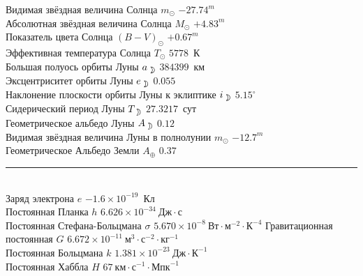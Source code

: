 Видимая звёздная величина Солнца $m_\odot$ \hfill $-27.74^m$\\
Абсолютная звёздная величина Солнца $M_\odot$ \hfill $+4.83^m$\\
Показатель цвета Солнца $(B - V)_\odot$ \hfill $+0.67^m$\\
Эффективная температура Солнца $T_\odot$ \hfill $5778$~К\\
Большая полуось орбиты Луны $a_{\moon}$ \hfill $384399$~км\\
Эксцентриситет орбиты Луны $e_{\moon}$ \hfill $0.055$\\
Наклонение плоскости орбиты Луны к эклиптике $i_{\moon}$ \hfill $5.15^\circ$\\
Сидерический период Луны $T_{\moon}$ \hfill $27.3217$~сут\\
Геометрическое альбедо Луны $A_{\moon}$ \hfill $0.12$\\
Видимая звёздная величина Луны в полнолунии $m_{\odot}$ \hfill $-12.7^m$\\
Геометрическое Альбедо Земли $A_\oplus$ \hfill $0.37$\\[-5pt]
\rule{\tw}{.7pt}\\
Заряд электрона $e$ \hfill $-1.6 \times 10^{-19}$~Кл\\
Постоянная Планка $h$ \hfill $6.626 \times 10^{-34}~\text{Дж}\cdot\text{с}$\\
Постоянная Стефана-Больцмана $\sigma$ \hfill $5.670 \times 10^{-8}~\text{Вт} \cdot \text{м}^{-2} \cdot \text{К}^{-4}$
Гравитационная постоянная $G$ \hfill $6.672 \times 10^{-11}~\text{м}^3 \cdot \text{с}^{-2} \cdot \text{кг}^{-1}$\\
Постоянная Больцмана $k$ \hfill $1.381 \times 10^{-23}~\text{Дж} \cdot \text{К}^{-1}$\\
Постоянная Хаббла $H$ \hfill $67~\text{км} \cdot \text{с}^{-1} \cdot \text{Мпк}^{-1}$


























